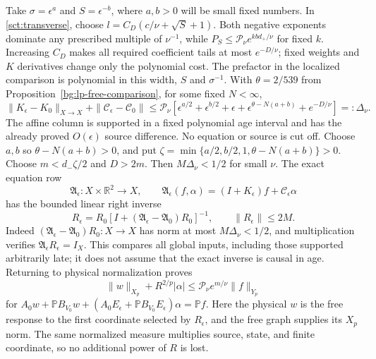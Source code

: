 Take $\sigma=\epsilon^{a}$ and $S=\epsilon^{-b}$, where $a,b>0$
will be small fixed numbers. In \eqref{sct:transverse}, choose
$l=C_D(c/\nu+\sqrt S+1)$. Both negative exponents dominate any
prescribed multiple of $\nu^{-1}$, while $P_S\le\mathcal P_\nu
e^{kb d_+/\nu}$ for fixed $k$. Increasing $C_D$ makes all required
coefficient tails at most $e^{-D/\nu}$; fixed weights and $K$
derivatives change only the polynomial cost. The prefactor in the
localized comparison is polynomial in this width, $S$ and
$\sigma^{-1}$. With $\theta=2/539$ from
Proposition~\ref{bg:lp-free-comparison}, for some fixed $N<\infty$,
\begin{equation}
 \|K_\epsilon-K_0\|_{X\to X}
 +\|\mathcal C_\epsilon-\mathcal C_0\|
 \le\mathcal P_\nu
 [\epsilon^{a/2}+\epsilon^{b/2}+\epsilon
       +\epsilon^{\theta-N(a+b)}+e^{-D/\nu}]
 =:\Delta_\nu.
 \label{short-bg:global-operator-comparison}
\end{equation}
The affine column is supported
in a fixed polynomial age interval and has the already proved
$O(\epsilon)$ source difference. No equation or source is cut off.
Choose $a,b$ so $\theta-N(a+b)>0$, and put
$\zeta=\min\{a/2,b/2,1,\theta-N(a+b)\}>0$.
Choose $m<d_-\zeta/2$ and $D>2m$. Then $M\Delta_\nu<1/2$ for
small $\nu$. The exact equation row
\[
 \mathfrak A_\epsilon:X\times\mathbb R^2\longrightarrow X,\qquad
 \mathfrak A_\epsilon(f,\alpha)
       =(I+K_\epsilon)f+\mathcal C_\epsilon\alpha
\]
has the bounded linear right inverse
\[
 R_\epsilon=R_0[I+(\mathfrak A_\epsilon-\mathfrak A_0)R_0]^{-1},
 \qquad \|R_\epsilon\|\le2M.
\]
Indeed $(\mathfrak A_\epsilon-\mathfrak A_0)R_0:X\to X$
has norm at most $M\Delta_\nu<1/2$, and multiplication verifies
$\mathfrak A_\epsilon R_\epsilon=I_X$.
This compares all global inputs, including those supported arbitrarily
late; it does not assume that the exact inverse is causal in age.
Returning to physical normalization proves
\begin{equation}
 \|w\|_{X_p}+R^{2/p}|\alpha|
 \le\mathcal P_\nu e^{m/\nu}
                \|f\|_{Y_p}
 \label{short-bg:exact-inverse}
\end{equation}
for
$A_0w+\mathbb PB_{V_0}w+(A_0E_\epsilon+\mathbb PB_{V_0}E_\epsilon)\alpha
=\mathbb Pf$. Here the physical $w$ is the free response to the
first coordinate selected by $R_\epsilon$, and the free graph supplies
its $X_p$ norm. The same normalized measure multiplies
source, state, and finite coordinate, so no additional power of $R$
is lost.

